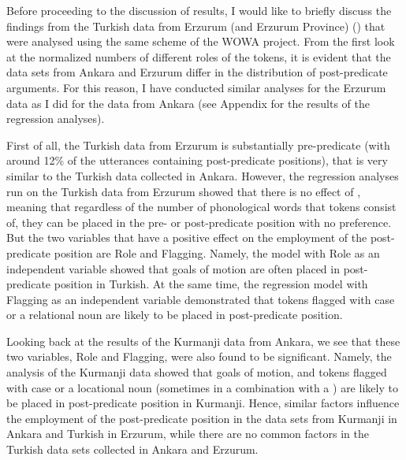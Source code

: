 \documentclass[output=paper,colorlinks,citecolor=brown]{langscibook}
\begin{document}
Before proceeding to the discussion of results, I would like to briefly discuss the findings from the Turkish data from Erzurum (and Erzurum Province) (\citealt{dogan_oghuz_2021}) that were analysed using the same scheme of the WOWA project. From the first look at the normalized numbers of different roles of the tokens, it is evident that the data sets from Ankara and Erzurum differ in the distribution of post-predicate arguments. For this reason, I have conducted similar analyses for the Erzurum data as I did for the data from Ankara (see Appendix for the results of the regression analyses). 

First of all, the Turkish data from Erzurum is substantially pre-predicate (with around 12\% of the utterances containing post-predicate positions), that is very similar to the Turkish data collected in Ankara. However, the regression analyses run on the Turkish data from Erzurum showed that there is no effect of , meaning that regardless of the number of phonological words that tokens consist of, they can be placed in the pre- or post-predicate position with no preference. But the two variables that have a positive effect on the employment of the post-predicate position are Role and Flagging. Namely, the model with Role as an independent variable showed that goals of motion are often placed in post-predicate position in Turkish. At the same time, the regression model with Flagging as an independent variable demonstrated that tokens flagged with case or a  relational noun are likely to be placed in post-predicate position. 

Looking back at the results of the Kurmanji data from Ankara, we see that these two variables, Role and Flagging, were also found to be significant. Namely, the analysis of the Kurmanji data showed that goals of motion, and tokens flagged with case or a locational noun (sometimes in a combination with a ) are likely to be placed in post-predicate position in Kurmanji. Hence, similar factors influence the employment of the post-predicate position in the data sets from Kurmanji in Ankara and Turkish in Erzurum, while there are no common factors in the Turkish data sets collected in Ankara and Erzurum.
\end{document}
